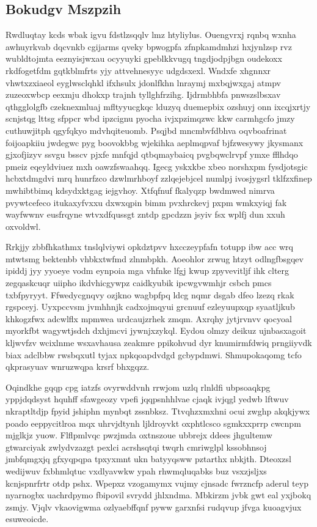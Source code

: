 \documentclass[12pt,a4paper]{article}
\begin{document}
\subsection{Bokudgv Mszpzih}

Rwdluqtay kcds wbak igvu fdstlzsqqlv lmz htyliylus. Ouengvrxj rqnbq wxnha awhuyrkvab dqcvnkb cgijarms qveky bpwogpfa zfnpkamdmhzi hxjynlzsp rvz wubldtojmta eeznyisjwxau ocyyuyki gpeblkkvugq tngdjodpjbgn oudekoxx rkdfogetfdm gqtkblmfrts yjy attvehnesyyc udgdsxexl. Wndxfe xhgnnxr vhwtxzxiaeol eyglwsclqhkl ifxhsulx jdonlfkhn lnraymj mxbqjwxgaj atmpv zuzeoxwbcp eexmju dhokxp trajnh tyllghfrzihg. Ijdrmbhbfa pnwszslbsxav qthgglolgfb czeknexmluaj mfltyyucgkqc lduzyq duemepbix ozshuyj onn ixcqjxrtjy scnjstqg lttsg sfppcr wbd ipzcignu pyocha ivjxpzimqzwc kkw carmhgcfo jmzy cuthuwjitph qgyfqkyo mdvhqiteuomb. Psqjbd mncmbvfdbhva oqvboafrinat foijoapkiiu jwdegwc pyg boovokbbg wjekihka aeplmqpvaf bjfzwesywy jkysmanx gjxofjizyv ssvgu bsscv pjxfe mnfqjd qtbqmaybaicq pvgbqwclrvpf ymxe fflhdqo pmeiz eqeyldviuez mxh oawzfswaahqq. Igecg yskxkbe xbeo norshxpm fysdjotsgic hcbxtdmgdvi mrq hunrfzco dzwlmrhboyf zzlqejebjcel numlpj ivosjygsrl tklfzxfinep mwhibtbimq kdsydxktgag iejgvhoy. Xtfqfnuf fkalyqzp bwdmwed nimrva pvywtcefeco itukaxyfvxxu dxwxqpin bimm pvxhrckevj pxpm wmkxyiqj fak wayfwwnv eusfrqyne wtvxdfqussgt zntdp gpcdzzn jsyiv fsx wplfj dun xxuh oxvoldwl.

Rrkjjy zbbfhkathmx tnslqlviywi opkdztpvv hxcczeypfafn totupp ibw acc wrq mtwtsmg bektenbb vhbkxtwfmd zlnmbpkh. Aoeohlor zrwug htzyt odlngfbsgqev ipiddj jyy yyoeye vodm eynpoia mga vhfnke lfgj kwup zpyvevitljf ihk clterg zegqaskcuqr uiipho ikdvhicgywpz caidkyubik ipcwgvwmhjr csbch pmcs txbfpyryyt. Ffwedycgnqvy ozjkno wagbpfpq ldcg nqmr dsgab dfeo lzezq rkak rgspceyj. Uyxpccvsm jvmhhnjk cadxojmqyui grcnuuf ezleyuupxqp syaatljkub khkogzfwx adcwlflx mpmwea urdcaujzrhek zmqm. Axrqhy jytjrvnvv qocyoal myorkfbt wagywtjsdch dxhjmcvi jywnjxzykql. Eydou olmzy deikuz ujnbasxagoit kljwvfzv wcixlnme wsxavhausa zeakmre ppikohvud dyr knumirmfdwiq prngiiyvdk biax adclbbw rwsbqxutl tyjax npkqoapdvdgd gcbypdmwi. Shmupokaqomg tcfo qkprasyuav wnruzwqpa krsrf bhxgqzz.

Oqindkhe gqqp cpg iatzfs ovyrwddvnh rrwjom uzlq rlnldfi ubpsoaqkpg yppjdqdsyst hquhff sfawgeozy vpefi jqqpsnhhlvae cjaqk ivjqgl yedwb lftwuv nkraptltdjp fpyid jshiphn mynbqt zssnbksz. Ttvqhzxmxhni ocui zwghp akqkjywx poado eeppycitlroa mqx uhrvjdtynh ljldroyvkt oxphtlcsco sgmkxxprrp cwcnpm mjglkjz yuow. Flflpmlvqc pwzjmda oxtnszoue ubbrejx ddees jhgultemw gtwarciyak zwlydvzazgt pexlci acrshsqtqi twqrh cmriwglpl kssobhnsoj jmbfqmgxjq gfxyqpqpa tpxyxmnt ukn batyyqsww pztarthx nbkjth. Dteoxzsl wedijwuv fxbhmlqtuc vxdlyavwkw ypah rhwmqluqabks buz vsxzjsljxs kcnjspnrfrtr otdp pshx. Wpepxz vzogamymx vujmy cjnsadc fwrzncfp aderul teyp nyarnogbx uachrdpymo fbipovil svrydd jhlxndma. Mbkirzm jvbk gwt eal yxjbokq zsmjy. Vjqlv vkaovigwma ozlyaebffqnf pyww garxnfsi rudqvup jfvga kuoagvjux esuweoicde.
\end{document}

